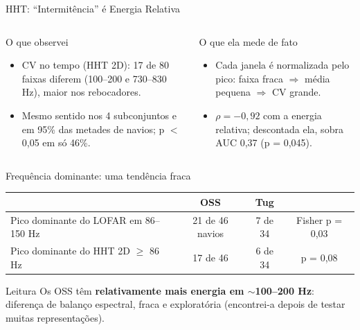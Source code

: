 \documentclass[aspectratio=169]{beamer}
\begin{document}
\begin{frame}{HHT: ``Intermitência'' é Energia Relativa}\vspace{-0.25cm}
    \footnotesize
    \begin{columns}[t]
        \begin{block}{\small O que observei}
            \scriptsize
            \begin{itemize}
                \setlength{\itemsep}{1pt}
                \item CV no tempo (HHT 2D): 17 de 80 faixas diferem (100--200 e 730--830 Hz), maior nos rebocadores.
                \item Mesmo sentido nos 4 subconjuntos e em 95\% das metades de navios; p $<$ 0,05 em só 46\%.
            \end{itemize}
        \end{block}
        \begin{block}{\small O que ela mede de fato}
            \scriptsize
            \begin{itemize}
                \setlength{\itemsep}{1pt}
                \item Cada janela é normalizada pelo pico: faixa fraca $\Rightarrow$ média pequena $\Rightarrow$ CV grande.
                \item $\rho = -0{,}92$ com a energia relativa; descontada ela, sobra AUC 0,37 (p = 0,045).
            \end{itemize}
        \end{block}
    \end{columns}
    \vspace{0.1cm}
    \begin{block}{\small Frequência dominante: uma tendência fraca}
        \scriptsize
        \centering
        \begin{tabular}{lccc}
        \toprule
         & OSS & Tug & \\
        \midrule
        Pico dominante do LOFAR em 86--150 Hz & 21 de 46 navios & 7 de 34 & Fisher p = 0,03 \\
        Pico dominante do HHT 2D $\geq$ 86 Hz & 17 de 46 & 6 de 34 & p = 0,08 \\
        \bottomrule
        \end{tabular}
    \end{block}
    \vspace{0.05cm}
    \begin{alertblock}{Leitura}
        \scriptsize
        Os OSS têm \textbf{relativamente mais energia em $\sim$100--200 Hz}: diferença de balanço espectral, fraca e exploratória (encontrei-a depois de testar muitas representações).
    \end{alertblock}
\end{frame}
\end{document}
